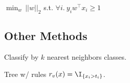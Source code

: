 \begin{definition}
  \(\min_w \, ||w||_2 \) s.t. \(\forall i. \ y_i w^\top x_i \geq 1\)
\end{definition}

\subsection{Other Methods}
\begin{definition}[kNN]
  Classify by \(k\) nearest neighbors classes.
\end{definition}

\begin{definition}
  Tree w/ rules \(r_v(x) = \I_{\{x_i > t_i\}}\).
\end{definition}
